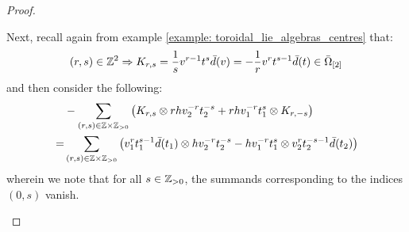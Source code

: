 \begin{proof}
\begin{enumerate}
                    Next, recall again from example \ref{example: toroidal_lie_algebras_centres} that:
                        $$(r, s) \in \mathbb{Z}^2 \Rightarrow K_{r, s} = \frac1s v^{r - 1} t^s \bar{d}(v) = -\frac1r v^r t^{s - 1} \bar{d}(t) \in \bar{\Omega}_{[2]}$$
                    and then consider the following:
                        $$
                            \begin{aligned}
                                & -\sum_{(r, s) \in \Z \x \Z_{> 0}} \left( K_{r, s} \tensor r h v_2^{-r} t_2^{-s} + r h v_1^{-r} t_1^s \tensor K_{r, -s} \right)
                                \\
                                = & \sum_{(r, s) \in \Z \x \Z_{> 0}} \left( v_1^r t_1^{s - 1} \bar{d}(t_1) \tensor h v_2^{-r} t_2^{-s} - h v_1^{-r} t_1^s \tensor v_2^r t_2^{-s - 1} \bar{d}(t_2) \right)
                            \end{aligned}
                        $$
                    wherein we note that for all $s \in \mathbb{Z}_{> 0}$, the summands corresponding to the indices $(0, s)$ vanish.


\end{enumerate}
\end{proof}
